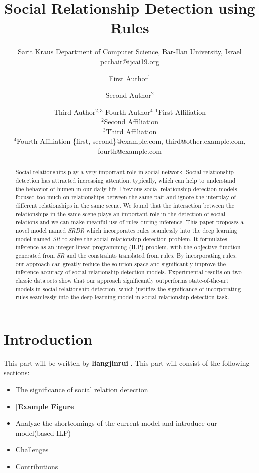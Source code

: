 \documentclass{article}
\title{Social Relationship Detection using Rules}
\author{
    Sarit Kraus
    \affiliations
    Department of Computer Science, Bar-Ilan University, Israel \emails
    pcchair@ijcai19.org
}
\author{
First Author$^1$
\and
Second Author$^2$\and
Third Author$^{2,3}$\And
Fourth Author$^4$
\affiliations
$^1$First Affiliation\\
$^2$Second Affiliation\\
$^3$Third Affiliation\\
$^4$Fourth Affiliation
\emails
\{first, second\}@example.com,
third@other.example.com,
fourth@example.com
}
\begin{document}
\maketitle

\begin{abstract}
Social relationships play a very important role in social network. Social relationship detection has attracted increasing attention, typically, which can help to understand the behavior of humen in our daily life. Previous social relationship detection models focused too much on relationships between the same pair and ignore the interplay of different relationships in the same scene.  We found that the interaction between the relationships in the same scene plays an important role in the detection of social relations and we can make meanful use of rules during inference. This paper proposes a novel model named {\it SRDR} which incorporates rules seamlessly into the deep learning model named {\it SR}  to solve the social relationship detection problem. It formulates inference as an integer linear programming (ILP) problem, with the objective function generated from {\it SR} and the constraints translated from rules. By incorporating rules, our approach can greatly reduce the solution space and significantly improve the inference accuracy of social relationship detection models. Experimental results on two classic data sets show that our approach significantly outperforms state-of-the-art  models in social relationship detection, which justifies the significance of incorporating rules seamlessly into the deep learning model in social relationship detection task.
\end{abstract}

\section{Introduction}

This part will be written by {\bf liangjinrui} . This part will consist of the following sections:
\begin{itemize}
	\item The significance of social relation detection
	\item {\bf [Example Figure]}
	\item Analyze the shortcomings of the current model and introduce our model(based ILP)
	\item Challenges
	\item Contributions
\end{itemize}
\end{document}
